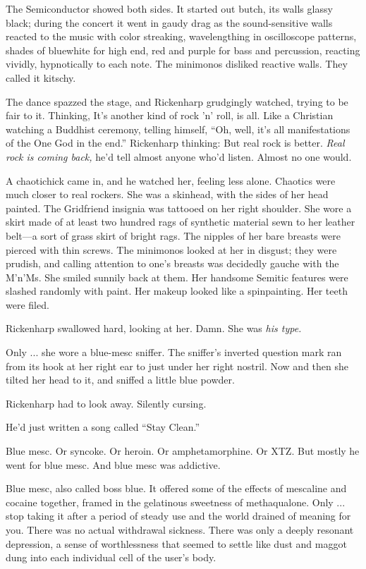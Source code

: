 The Semiconductor showed both sides. It started out butch, its walls glassy black; during the concert it went in gaudy drag as the sound-sensitive walls reacted to the music with color streaking, wavelengthing in oscilloscope patterns, shades of bluewhite for high end, red and purple for bass and percussion, reacting vividly, hypnotically to each note. The minimonos disliked reactive walls. They called it kitschy.

The dance spazzed the stage, and Rickenharp grudgingly watched, trying to be fair to it. Thinking, It's another kind of rock 'n' roll, is all. Like a Christian watching a Buddhist ceremony, telling himself, ``Oh, well, it's all manifestations of the One God in the end.'' Rickenharp thinking: But real rock is better. \textit{Real rock is coming back,} he'd tell almost anyone who'd listen. Almost no one would.

A chaotichick came in, and he watched her, feeling less alone. Chaotics were much closer to real rockers. She was a skinhead, with the sides of her head painted. The Gridfriend insignia was tattooed on her right shoulder. She wore a skirt made of at least two hundred rags of synthetic material sewn to her leather belt---a sort of grass skirt of bright rags. The nipples of her bare breasts were pierced with thin screws. The minimonos looked at her in disgust; they were prudish, and calling attention to one's breasts was decidedly gauche with the M'n'Ms. She smiled sunnily back at them. Her handsome Semitic features were slashed randomly with paint. Her makeup looked like a spinpainting. Her teeth were filed.

Rickenharp swallowed hard, looking at her. Damn. She was \textit{his type.}

Only ... she wore a blue-mesc sniffer. The sniffer's inverted question mark ran from its hook at her right ear to just under her right nostril. Now and then she tilted her head to it, and sniffed a little blue powder.

Rickenharp had to look away. Silently cursing.

He'd just written a song called ``Stay Clean.''

Blue mesc. Or syncoke. Or heroin. Or amphetamorphine. Or XTZ. But mostly he went for blue mesc. And blue mesc was addictive.

Blue mesc, also called boss blue. It offered some of the effects of mescaline and cocaine together, framed in the gelatinous sweetness of methaqualone. Only ... stop taking it after a period of steady use and the world drained of meaning for you. There was no actual withdrawal sickness. There was only a deeply resonant depression, a sense of worthlessness that seemed to settle like dust and maggot dung into each individual cell of the user's body.

